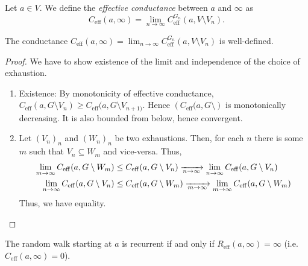 \begin{defn}
  Let \(a \in V\). We define the \emph{effective conductance} between \(a\) and \(\infty \) as \[C_{\mathrm{eff}}(a,\infty) = \lim_{n \to \infty} C_{\mathrm{eff}}^{G_n}(a, V \setminus V_n).\]
\end{defn}


\begin{fact}
  The conductance \(C_{\mathrm{eff}}(a,\infty )= \lim_{n \to \infty} C_{\mathrm{eff}}^{G_n}(a,V \setminus V_n)\) is well-defined. 
\end{fact}

\begin{proof}
    We have to show existence of the limit and independence of the choice of exhaustion.
  \begin{enumerate}[]
    \item Existence: By monotonicity of effective conductance, \(C_{\mathrm{eff}}(a,G \setminus V_n) \geq C_{\mathrm{eff}}(a,G \setminus V_{n+1)}\). Hence \( \left(C_{\mathrm{eff}}(a,G \setminus \right)\) is monotonically decreasing. It is also bounded from below, hence convergent.
    \item Let \((V_n)_n\) and \((W_n)_n\) be two exhaustions. Then, for each \(n\) there is some \(m\) such that \(V_n \subseteq W_m\) and vice-versa. Thus,
      \begin{align*}
        \lim_{m \to \infty} C_{\mathrm{eff}}(a,G \setminus W_m) &\leq C_{\mathrm{eff}}(a,G \setminus  V_n) \myxrightarrow[n\to\infty ]{} \lim_{n \to \infty} C_{\mathrm{eff}}(a, G \setminus V_n) \\
        \lim_{n \to \infty} C_{\mathrm{eff}}(a,G \setminus V_n) &\leq C_{\mathrm{eff}}(a, G \setminus W_m) \myxrightarrow[m\to\infty ]{} \lim_{m \to \infty} C_{\mathrm{eff}}(a, G \setminus W_m)
      \end{align*}
      Thus, we have equality.
  \end{enumerate}
  
\end{proof}

\begin{thm}[]
    The random walk starting at \(a\) is recurrent if and only if \(R_{\mathrm{eff}}(a, \infty ) = \infty \) (i.e. \(C_{\mathrm{eff}}(a, \infty )=0\)).
\end{thm}


